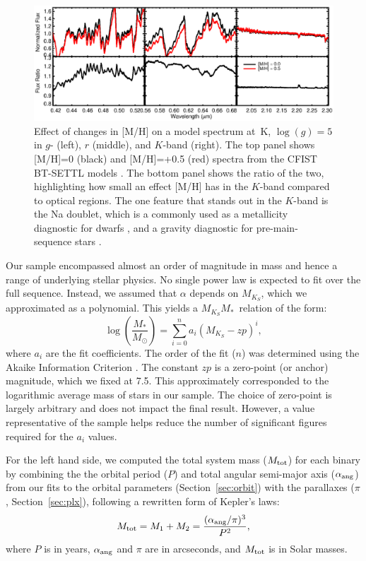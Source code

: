 \documentclass[twocolumn]{aastex62}
\newcommand{\mks}{$M_{K_S}$}
\newcommand{\mmk}{$M_{K_S}$\textendash$M_*$}
\begin{document}
\begin{figure}[htb]
\begin{center}
\includegraphics[width=\textwidth]{metallicity_effect.eps}
\caption{Effect of changes in [M/H] on a model spectrum at \,K, $\log(g)=5$ in $g$- (left), $r$ (middle), and $K$-band (right). The top panel shows [M/H]=0 (black) and [M/H]=+0.5 (red) spectra from the CFIST BT-SETTL models \citep{2012RSPTA.370.2765A}. The bottom panel shows the ratio of the two, highlighting how small an effect [M/H] has in the $K$-band compared to optical regions. The one feature that stands out in the $K$-band is the Na doublet, which is a commonly used as a metallicity diagnostic for dwarfs \citep{RojasAyala:2010,Terrien:2012lr,Newton:2014}, and a gravity diagnostic for pre-main-sequence stars \citep[e.g.,][]{Schlieder2012}. }
\label{fig:metal}
\end{center}
\end{figure}

Our sample encompassed almost an order of magnitude in mass and hence a range of underlying stellar physics. No single power law is expected to fit over the full sequence. Instead, we assumed that $\alpha$ depends on \mks, which we approximated as a polynomial. This yields a \mmk\ relation of the form:
\begin{equation}\label{eqn:mmk}
\log \left( \frac{M_*}{M_\odot} \right) = \sum_{i=0}^{n} a_i(M_{K_S}-zp)^i,
\end{equation}
where $a_i$ are the fit coefficients. The order of the fit ($n$) was determined using the Akaike Information Criterion \citep[AIC, ][]{Akaike1974}. The constant $zp$ is a zero-point (or anchor) magnitude, which we fixed at 7.5. This approximately corresponded to the logarithmic average mass of stars in our sample. The choice of zero-point is largely arbitrary and does not impact the final result. However, a value representative of the sample helps reduce the number of significant figures required for the $a_i$ values.

For the left hand side, we computed the total system mass ($M_{\rm{tot}}$) for each binary by combining the the orbital period ($P$) and total angular semi-major axis ($\alpha_{\rm{ang}}$) from our fits to the orbital parameters (Section~\ref{sec:orbit}) with the parallaxes ($\pi$, Section~\ref{sec:plx}), following a rewritten form of Kepler's laws:
\begin{equation}\label{eqn:mass}
M_{\rm{tot}} = M_{1}+M_{2} = \frac{(\alpha_{\rm{ang}}/\pi)^3}{P^2},
\end{equation}
where $P$ is in years, $\alpha_{\rm{ang}}$ and $\pi$ are in arcseconds, and $M_{\rm{tot}}$ is in Solar masses. 
\end{document}
